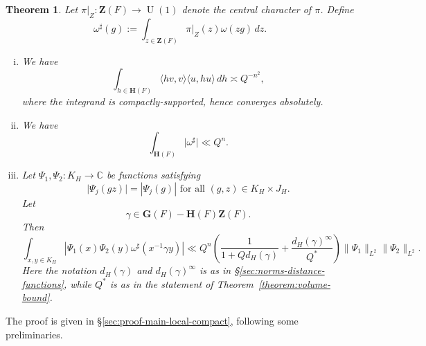 \documentclass[reqno]{amsart}
\DeclareMathOperator{\U}{U}
\theoremstyle{plain} \newtheorem{theorem} {Theorem} \newtheorem{conjecture} {Conjecture} \newtheorem{corollary} [theorem] {Corollary} \newtheorem{proposition} [theorem] {Proposition} \newtheorem{fact} [theorem] {Fact}
\theoremstyle{definition} \newtheorem{definition} [theorem] {Definition}
\theoremstyle{itplain} %
\begin{document}
\begin{theorem}
  Let $\pi|_{Z} : \mathbf{Z}(F) \rightarrow \U(1)$ denote the central character of $\pi$.  Define
  \begin{equation*}
    \omega ^\sharp (g) := \int _{z \in \mathbf{Z}(F) } \pi|_{Z} (z) \omega (z g ) \, d z.
  \end{equation*}
  \begin{enumerate}[(i)]
  \item\label{enumerate:20230517151810} We have
    \begin{equation}\label{eqn:sum-_v-in-mathc-mathc-pif-v-otim-u-gg-q-n2-}
      \int _{h \in \mathbf{H}(F)} \langle h v, v \rangle \langle u, h u \rangle \, d h \asymp Q^{-n^2},
    \end{equation}
    where the integrand is compactly-supported, hence converges absolutely.
  \item\label{enumerate:20230517151812} We have
    \begin{equation}\label{eqn:int-_mathbfhf-lvert-f-sharp-rvert-ll-q-n.-}
      \int _{\mathbf{H}(F)} \lvert \omega ^\sharp  \rvert \ll Q ^{n}.
    \end{equation}
  \item\label{enumerate:20230517165012} Let $\Psi_1, \Psi_2 : K_H \rightarrow \mathbb{C}$ be functions satisfying
    \begin{equation*}
      \lvert \Psi_j(g z) \rvert = \left\lvert \Psi_j(g) \right\rvert \text{ for all } (g,z) \in K_H \times  J_H.
    \end{equation*}
    Let
    \begin{equation*}
      \gamma \in \mathbf{G}(F) - \mathbf{H}(F) \mathbf{Z}(F).
    \end{equation*}
    Then
    \begin{equation}\label{eqn:int-_x-y-in-k_h-leftlv-psi_1x-psi_2y-omega-sharp-x}
      \int _{x, y \in K_H} \left\lvert \Psi_1(x) \Psi_2(y) \omega ^\sharp (x ^{-1} \gamma y) \right\rvert
      \ll
      Q^n
      \left( \frac{1}{1 + Q d_H(\gamma)} + \frac{{d_H(\gamma)}^{\infty}}{Q^*} \right)
      \lVert \Psi_1 \rVert_{L^2}    
      \lVert \Psi_2 \rVert_{L^2}.
    \end{equation}
    Here the notation $d_H(\gamma)$ and $d_H(\gamma)^\infty$ is as in \S\ref{sec:norms-distance-functions}, while $Q^*$ is as in the statement of Theorem~\ref{theorem:volume-bound}.
  \end{enumerate}
\end{theorem}

The proof is given in \S\ref{sec:proof-main-local-compact}, following some preliminaries.
\end{document}
